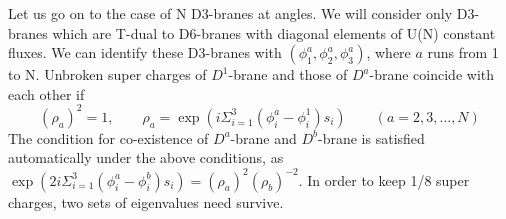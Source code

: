 \documentclass[a4paper,12pt]{article}
\begin{document}
Let us go on to the case of N D3-branes at angles. We will consider only D3-branes which are T-dual to D6-branes with diagonal elements of U(N) constant fluxes. We can identify these D3-branes with $(\phi^a_1,\phi^a_2,\phi^a_3)$, where $a$ runs from 1 to N. Unbroken super charges of $D^1$-brane and those of $D^a$-brane coincide with each other if 
\[(\rho_a)^2 = 1 , \qquad \rho_a = \exp(i\Sigma_{i=1}^3 (\phi^a_i-\phi^1_i ) s_i) \qquad  ( a = 2, 3, \ldots, N ) \]
The condition for co-existence of $D^a$-brane and $D^b$-brane is satisfied automatically under the above conditions, as $ \exp(2i\Sigma_{i=1}^3 (\phi^a_i-\phi^b_i ) s_i) = (\rho_a)^2(\rho_b)^{-2}.$
In order to keep 1/8 super charges, two sets of eigenvalues need survive. 

\begin{tabular}{l|l}


\end{tabular}
\end{document}
